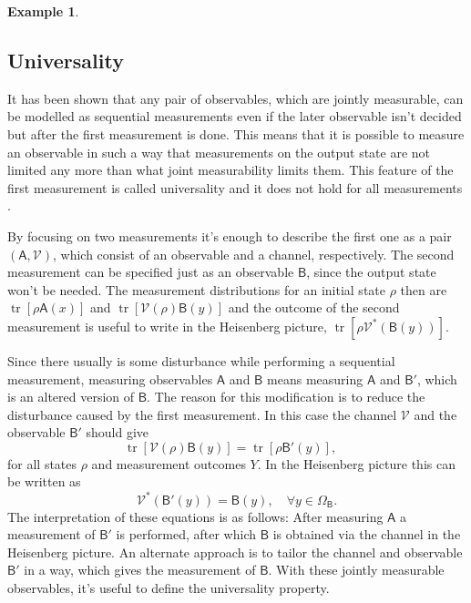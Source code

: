 \documentclass[a4paper,12pt]{wihuri}
\theoremstyle{definition}
\newtheorem{example}{Example}
\numberwithin{definition}{section}
\numberwithin{example}{section}
\numberwithin{theorem}{section}
\numberwithin{proposition}{section}
\numberwithin{lemma}{section}
\newcommand{\V}{\mathcal{V}}%
\newcommand{\A}{\mathsf{A}}%
\newcommand{\B}{\mathsf{B}}%
\DeclareMathOperator{\tr}{tr}
\begin{document}
\begin{example}
\end{example}



\subsection{Universality}
It has been shown that any pair of observables, which are jointly measurable, can be modelled as sequential measurements even if the later observable isn't decided but after the first measurement is done. This means that it is possible to measure an observable in such a way that measurements on the output state are not limited any more than what joint measurability limits them. This feature of the first measurement is called universality and it does not hold for all measurements \cite{heinosaari_miyadera_universality}. 

By focusing on two measurements it's enough to describe the first one as a pair $(\A, \V)$, which consist of an observable and a channel, respectively. The second measurement can be specified just as an observable $\B$, since the output state won't be needed. The measurement distributions for an initial state $\rho$ then are $\tr[\rho\A(x)]$ and $\tr[\V(\rho)\B(y)]$ and the outcome of the second measurement is useful to write in the Heisenberg picture, $\tr[\rho\V^*(\B(y))]$.

Since there usually is some disturbance while performing a sequential measurement, measuring observables $\A$ and $\B$ means measuring $\A$ and $\B'$, which is an altered version of $\B$. The reason for this modification is to reduce the disturbance caused by the first measurement. In this case the channel $\V$ and the observable $\B'$ should give 
\begin{equation}
\tr[\V(\rho)\B(y)] = \tr[\rho\B'(y)],\quad
\end{equation}
for all states $\rho$ and measurement outcomes $Y$. In the Heisenberg picture this can be written as 
\begin{equation}
\V^*(\B'(y)) = \B(y), \quad \forall y \in \Omega_{\B}\text{.}
\end{equation}
The interpretation of these equations is as follows: After measuring $\A$ a measurement of $\B'$ is performed, after which $\B$ is obtained via the channel in the Heisenberg picture. An alternate approach is to tailor the channel and observable $\B'$ in a way, which gives the measurement of $\B$. With these jointly measurable observables, it's useful to define the universality property.
\end{document}

